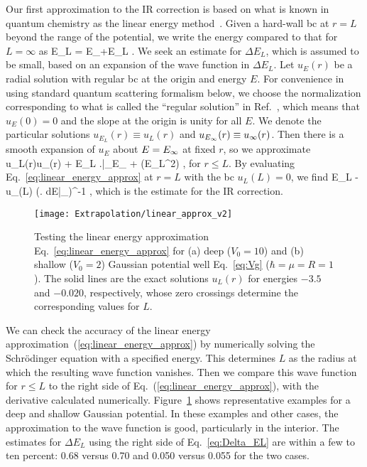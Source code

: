 	Our first approximation to the IR correction
	is based on what is known in quantum chemistry
	as the linear energy method~\cite{Djajaputra:2000aa}.  Given a
	hard-wall bc at $r=L$ beyond the range of the
	potential, we write the energy compared to that for $L=\infty$ as
	\beq
	 E_L = E_{\infty}+\Delta E_L
	 \;.
	\eeq
	We seek an estimate for $\Delta E_L$, which is assumed to be small,
	based on an expansion of the wave function in $\Delta E_L$.  Let
	$u_E(r)$ be a radial solution with regular bc at the
	origin and energy $E$.  For convenience in using standard quantum
	scattering formalism below, we choose the normalization corresponding
	to what is called the ``regular solution'' in
	Ref.~\cite{taylor2006scattering}, which means that $u_E(0) = 0$ and
	the slope at the origin is unity for all $E$.  We denote the
	particular solutions $u_{E_L}(r)\equiv u_L(r)$ and $u_{E_{\infty}}(r)
	\equiv u_\infty (r)$. Then there is a smooth expansion of $u_E$ about
	$E=E_{\infty}$ at fixed $r$, so we approximate~\cite{Djajaputra:2000aa}
	\beq
	  u_L(r)\approx u_\infty (r) + \Delta E_L
	  \left.\right|_{E_{\infty}}
	  + (\Delta E_L^2) \;,
	  \label{eq:linear_energy_approx}
	\eeq
	for $r\leq L$.
	By evaluating Eq.~\eqref{eq:linear_energy_approx} at $r=L$ with the
	bc $u_L(L)=0$, we find
	\beq
	  \Delta E_L \approx -u_\infty(L) \left(\left.
	  {dE}\right|_{\Einf}\right)^{-1}
	  \;,
	  \label{eq:Delta_EL}
	\eeq
	which is the estimate for the IR correction.

	\begin{figure}[h]
	\centering
	\texttt{[image: Extrapolation/linear\_approx\_v2]}
	\caption{Testing the linear energy approximation
	  Eq.~\eqref{eq:linear_energy_approx} for (a) deep ($V_0=10$) and (b)
	  shallow ($V_0=2$) Gaussian potential well Eq.~\eqref{eq:Vg}
		($\hbar = \mu = R=1$).
	  The solid lines are the exact solutions $u_L(r)$ for energies $-3.5$
	  and $-0.020$, respectively, whose zero crossings determine the
	  corresponding values for $L$.}
	\label{fig:linear_energy_approx}
	\end{figure}

	We can check the accuracy of the linear energy
	approximation~(\ref{eq:linear_energy_approx}) by numerically solving
	the Schr\"odinger equation with a specified energy.  This determines
	$L$ as the radius at which the resulting wave function vanishes. Then
	we compare this wave function for $r \leq L$ to the right side of
	Eq.~(\ref{eq:linear_energy_approx}), with the derivative calculated
	numerically.  Figure~\ref{fig:linear_energy_approx} shows
	representative examples for a deep and shallow Gaussian potential.  In
	these examples and other cases, the approximation to the wave function
	is good, particularly in the interior.  The estimates for $\Delta E_L$
	using the right side of Eq.~\eqref{eq:Delta_EL} are within a few to
	ten percent: 0.68 versus 0.70 and 0.050 versus 0.055 for the two
	cases.

